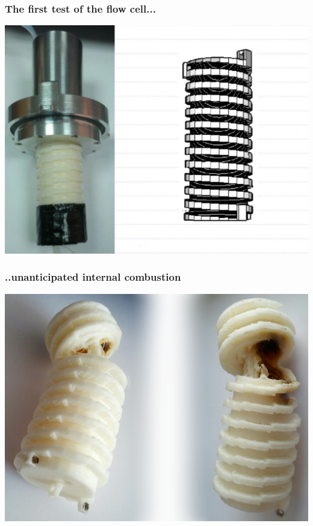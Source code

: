 \documentclass[10pt, compress]{beamer}
\begin{document}
\begin{frame}
\frametitle{The first test of the flow cell...}
\vspace{-1cm}
\begin{center}
\includegraphics[width=\textwidth]{v2insitu.PNG}\end{center}
\end{frame}

\begin{frame}
\frametitle{..unanticipated internal combustion}
\vspace{-1cm}
\includegraphics[width=\textwidth]{flowfail.PNG}
\end{frame}
\end{document}
